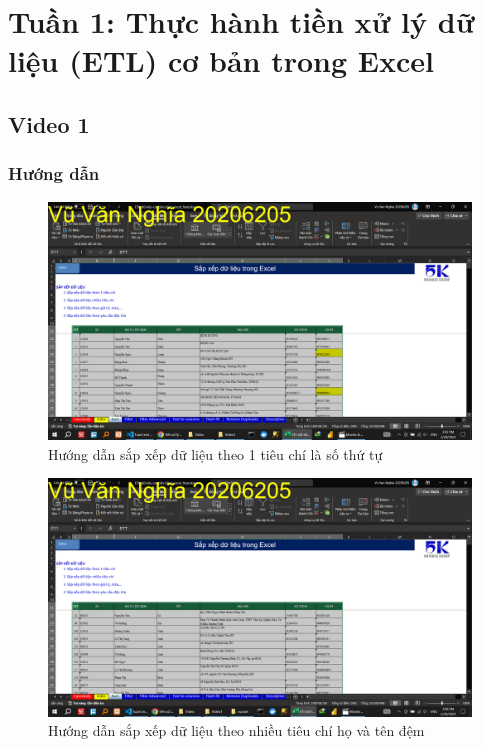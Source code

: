 \documentclass{article}
\begin{document}
\tableofcontents
\newpage
\listoffigures
\newpage
\section{Tuần 1: Thực hành tiền xử lý dữ liệu (ETL) cơ bản trong Excel}



\newpage
\subsection{Video 1}
\subsubsection{Hướng dẫn}
\begin{figure}[h]
    \centering
    \includegraphics[scale = 0.15]{Video1/HuongDan/1.png}
    \caption{Hướng dẫn sắp xếp dữ liệu theo 1 tiêu chí là số thứ tự}
\end{figure}
\begin{figure}[h]
    \centering
    \includegraphics[scale = 0.15]{Video1/HuongDan/2.png}
    \caption{Hướng dẫn sắp xếp dữ liệu theo  nhiều tiêu chí họ và tên đệm}
\end{figure}
\end{document}
